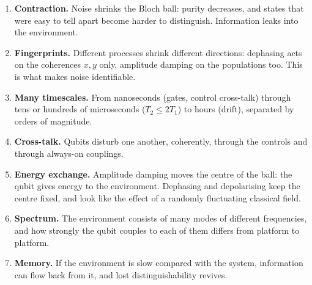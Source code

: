 \documentclass[handoutsbeamer.tex]{subfiles}
\begin{document}
\begin{frame}\mop{\footnotesize}
\begin{enumerate}\setlength\itemsep{0.15em}
    \item \textbf{Contraction.} Noise shrinks the Bloch ball: purity decreases, and states that were easy to tell apart become harder to distinguish. Information leaks into the environment.
    \item \textbf{Fingerprints.} Different processes shrink different directions: dephasing acts on the coherences $x,y$ only, amplitude damping on the populations too. This is what makes noise identifiable.
    \item \textbf{Many timescales.} From nanoseconds (gates, control cross-talk) through tens or hundreds of microseconds ($T_2\le2T_1$) to hours (drift), separated by orders of magnitude.
    \item \textbf{Cross-talk.} Qubits disturb one another, coherently, through the controls and through always-on couplings.
    \item \textbf{Energy exchange.} Amplitude damping moves the centre of the ball: the qubit gives energy to the environment. Dephasing and depolarising keep the centre fixed, and look like the effect of a randomly fluctuating classical field.
    \item \textbf{Spectrum.} The environment consists of many modes of different frequencies, and how strongly the qubit couples to each of them differs from platform to platform.
    \item \textbf{Memory.} If the environment is slow compared with the system, information can flow back from it, and lost distinguishability revives.
\end{enumerate}
\end{frame}
\end{document}
